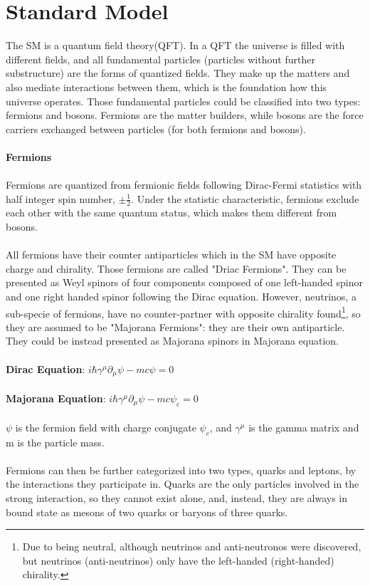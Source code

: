 \section{Standard Model}
The SM is a quantum field theory(QFT). In a QFT the universe is filled with different fields, and all fundamental particles (particles without further substructure) are the forms of quantized fields. They make up the matters and also mediate interactions between them, which is the foundation how this universe operates. Those fundamental particles could be classified into two types: fermions and bosons. Fermions are the matter builders, while bosons are the force carriers exchanged between particles (for both fermions and bosons). 
\\
\\{\bf Fermions}
\\
\\Fermions are quantized from fermionic fields following Dirac-Fermi statistics with half integer spin number, $\pm\frac{1}{2}$. Under the statistic characteristic, fermions exclude each other with the same quantum status, which makes them different from bosons. \\
\\
All fermions have their counter antiparticles which in the SM have opposite charge and chirality. Those fermions are called "Driac Fermions". They can be presented as Weyl spinors of four components composed of one left-handed spinor and one right handed spinor following the Dirac equation. However, neutrinos, a sub-specie of fermions, have no counter-partner with opposite chirality found\footnote{Due to being neutral, although neutrinos and anti-neutronos were discovered, but neutrinos (anti-neutrinos) only have the left-handed (right-handed) chirality.}, so they are assumed to be "Majorana Fermions": they are their own antiparticle. They could be instead presented as Majorana spinors in Majorana equation. 
\\
\\{\bf Dirac Equation}: $i\hbar\gamma^{\mu}\partial_{\mu}\psi-mc\psi=0$ 
\\
\\{\bf Majorana Equation}: $i\hbar\gamma^\mu\partial_\mu\psi-mc\psi_c=0$
\\
\\$\psi$ is the fermion field with charge conjugate $\psi_c$, and $\gamma^\mu$ is the gamma matrix and m is the particle mass.
\\ 
\\Fermions can then be further categorized into two types, quarks and leptons, by the interactions they participate in. Quarks are the only particles involved in the strong interaction, so they cannot exist alone, and, instead, they are always in bound state as mesons of two quarks or baryons of three quarks. 
